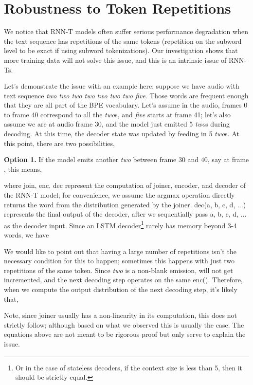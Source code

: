 \documentclass{article}
\begin{document}
\section{Robustness to Token Repetitions}
We notice that RNN-T models often suffer serious performance degradation when the text sequence has repetitions of the same tokens (repetition on the subword level to be exact if using subword tokenizations). Our investigation shows that more training data will not solve this issue, and this is an intrinsic issue of RNN-Ts.

Let's demonstrate the issue with an example here: suppose we have audio with text sequence \emph{two two two two two two two five}. Those words are frequent enough that they are all part of the BPE vocabulary. Let's assume in the audio, frames 0 to frame 40 correspond to all the \emph{two}s, and \emph{five} starts at frame 41; let's also assume we are at audio frame 30, and the model just emitted 5 \emph{two}s during  decoding. At this time, the decoder state was updated by feeding in 5 \emph{two}s.
At this point, there are two possibilities,

\textbf{Option 1.} If the model emits another \emph{two} between frame 30 and 40, say at frame , this means,

where join, enc, dec represent the computation of joiner, encoder, and decoder of the RNN-T model; for convenience, we assume the argmax operation directly returns the word from the distribution generated by the joiner. dec(a, b, c, d, ...) represents the final output of the decoder, after we sequentially pass a, b, c, d, ... as the decoder input. Since an LSTM decoder\footnote{Or in the case of stateless decoders, if the context size is less than 5, then it should be strictly equal.} rarely has memory beyond 3-4 words, we have 

We would like to point out that having a large number of repetitions isn't the necessary condition for this to happen; sometimes this happens with just two repetitions of the same token. 
Since \emph{two} is a non-blank emission,  will not get incremented, and the next decoding step operates on the same enc(). 
Therefore, when we compute the output distribution of the next decoding step, it's likely that,

Note, since joiner usually has a non-linearity in its computation, this does not strictly follow; although based on what we observed this is usually the case. The equations above are not meant to be rigorous proof but only serve to explain the issue.
\end{document}
